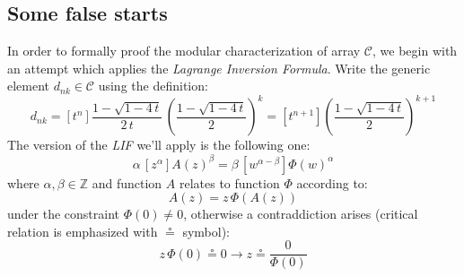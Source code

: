\subsection{Some false starts}

In order to formally proof the modular characterization of array $\mathcal{C}$, 
we begin with an attempt which applies the \emph{Lagrange Inversion Formula}. 
Write the generic element $d_{nk}\in\mathcal{C}$ using the definition:
\begin{displaymath}
    d_{nk} = [t^n] \frac{1-\sqrt{1-4\,t}}{2\,t}\,
        \left(\frac{1-\sqrt{1-4\,t}}{2}\right)^{k}
           = [t^{n+1}] \left(\frac{1-\sqrt{1-4\,t}}{2}\right)^{k+1} 
\end{displaymath}
The version of the \emph{LIF} we'll apply is the following one:
\begin{displaymath}
    \alpha\,\left[z^\alpha\right] A(z)^{\beta} = 
        \beta\,\left[w^{\alpha-\beta}\right]\Phi(w)^{\alpha}
\end{displaymath}
where $\alpha,\beta\in\mathbb{Z}$ and function $A$ relates to function
$\Phi$ according to: 
\begin{displaymath} A(z)=z\,\Phi(A(z)) \end{displaymath}
under the constraint $\Phi(0)\not=0$, otherwise a contraddiction arises
(critical relation is emphasized with $\circeq$ symbol):
\begin{displaymath} 
    z\,\Phi(0) \circeq 0 \rightarrow z\circeq\frac{0}{\Phi(0)} 
\end{displaymath}

